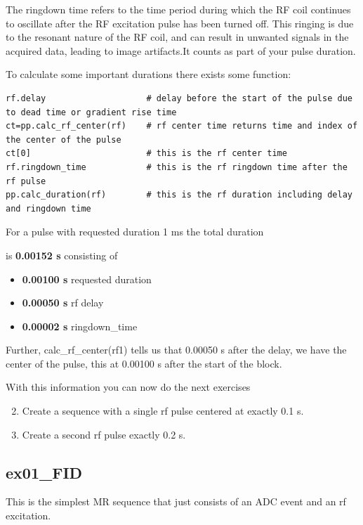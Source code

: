 \documentclass[a4paper,12pt]{extarticle}
\begin{document}
The ringdown time refers to the time period during which the RF coil continues to oscillate after the RF excitation pulse has been turned off. This ringing is due to the resonant nature of the RF coil, and can result in unwanted signals in the acquired data, leading to image artifacts.It counts as part of your pulse duration. 

To calculate some important durations there exists some function:
\begin{verbatim}
rf.delay                    # delay before the start of the pulse due to dead time or gradient rise time
ct=pp.calc_rf_center(rf)    # rf center time returns time and index of the center of the pulse
ct[0]                       # this is the rf center time
rf.ringdown_time            # this is the rf ringdown time after the rf pulse
pp.calc_duration(rf)        # this is the rf duration including delay and ringdown time
\end{verbatim}

For a pulse with requested duration 1 ms the total duration

is\textbf{ 0.00152 s} consisting of 
\begin{itemize}
    \item \textbf{0.00100 s}  requested duration
    \item \textbf{0.00050 s} rf  delay
    \item \textbf{0.00002 s} ringdown\_time
\end{itemize}
Further, calc\_rf\_center(rf1) tells us that 0.00050 s after the delay, we have the center of the pulse, this at 0.00100 s  after the start of the block.

With this information you can now do the next exercises

\begin{enumerate}
\setcounter{enumi}{1}

\item 	Create a sequence with a single rf pulse centered at exactly 0.1 s. 
\item 	Create a second rf pulse exactly 0.2 s. 

\end{enumerate}

\newpage
\subsection{ex01\_FID}
This is  the simplest MR sequence that just consists of an ADC event and an rf excitation.
\end{document}
